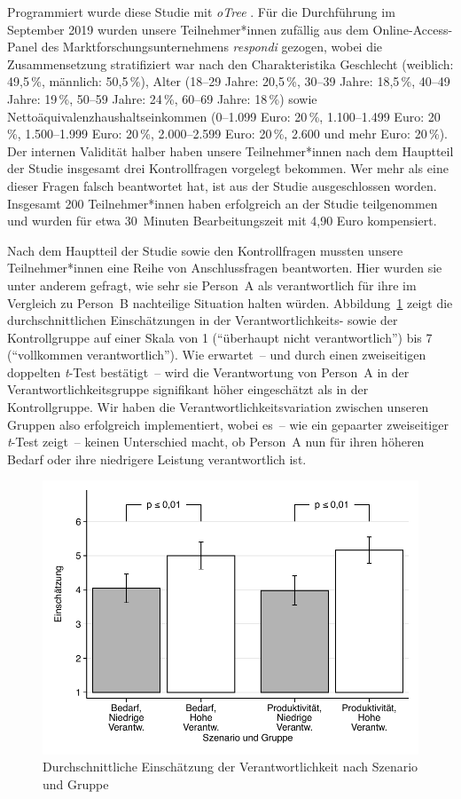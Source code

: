 \documentclass[justified,nobib,nohyper,symmetric,twoside]{tufte-book}
\begin{document}
Programmiert wurde diese Studie mit \textit{oTree} \citep{chen_otree_2016}.
Für die Durchführung im September 2019 wurden unsere Teilnehmer*innen zufällig aus dem Online-Access-Panel des Marktforschungsunternehmens \textit{respondi} gezogen, wobei die Zusammensetzung stratifiziert war nach den Charakteristika Geschlecht (weiblich: 49,5\,\%, männlich: 50,5\,\%), Alter (18--29 Jahre: 20,5\,\%, 30--39 Jahre: 18,5\,\%, 40--49 Jahre: 19\,\%, 50--59 Jahre: 24\,\%, 60--69 Jahre: 18\,\%) sowie Nettoäquivalenzhaushaltseinkommen (0--1.099 Euro: 20\,\%, 1.100--1.499 Euro: 20\,\%, 1.500--1.999 Euro: 20\,\%, 2.000--2.599 Euro: 20\,\%, 2.600 und mehr Euro: 20\,\%).
Der internen Validität halber haben unsere Teilnehmer*innen nach dem Hauptteil der Studie insgesamt drei Kontrollfragen vorgelegt bekommen.
Wer mehr als eine dieser Fragen falsch beantwortet hat, ist aus der Studie ausgeschlossen worden.
Insgesamt 200 Teilnehmer*innen haben erfolgreich an der Studie teilgenommen und wurden für etwa 30~Minuten Bearbeitungszeit mit 4,90 Euro kompensiert.

Nach dem Hauptteil der Studie sowie den Kontrollfragen mussten unsere Teilnehmer*innen eine Reihe von Anschlussfragen beantworten.
Hier wurden sie unter anderem gefragt, wie sehr sie Person~A als verantwortlich für ihre im Vergleich zu Person~B nachteilige Situation halten würden.
Abbildung~\ref{fig:abbildung_6} zeigt die durchschnittlichen Einschätzungen in der Verantwortlichkeits- sowie der Kontrollgruppe auf einer Skala von 1 (\enquote{überhaupt nicht verantwortlich}) bis 7 (\enquote{vollkommen verantwortlich}).
Wie erwartet~-- und durch einen zweiseitigen doppelten \textit{t}-Test bestätigt~-- wird die Verantwortung von Person~A in der Verantwortlichkeitsgruppe signifikant höher eingeschätzt als in der Kontrollgruppe.
Wir haben die Verantwortlichkeitsvariation zwischen unseren Gruppen also erfolgreich implementiert, wobei es~-- wie ein gepaarter zweiseitiger \textit{t}-Test zeigt~-- keinen Unterschied macht, ob Person~A nun für ihren höheren Bedarf oder ihre niedrigere Leistung verantwortlich ist.

\begin{figure}[t]\label{fig:abbildung_6}
   \center
   \includegraphics[width=0.99\linewidth]{figure_6.pdf}
   \caption{Durchschnittli\-che Einschätzung der Verantwortlichkeit nach Szenario und Gruppe}
\end{figure}
\end{document}
